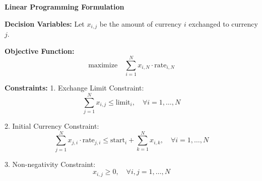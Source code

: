 \documentclass{article}
\begin{document}
\textbf{Linear Programming Formulation}

\textbf{Decision Variables:}
Let \( x_{i,j} \) be the amount of currency \( i \) exchanged to currency \( j \).

\textbf{Objective Function:}
\[
\text{maximize} \quad \sum_{i=1}^{N} x_{i,N} \cdot \text{rate}_{i,N}
\]

\textbf{Constraints:}
1. Exchange Limit Constraint:
\[
\sum_{j=1}^{N} x_{i,j} \leq \text{limit}_i, \quad \forall i = 1, \ldots, N
\]

2. Initial Currency Constraint:
\[
\sum_{j=1}^{N} x_{j,i} \cdot \text{rate}_{j,i} \leq \text{start}_i + \sum_{k=1}^{N} x_{i,k}, \quad \forall i = 1, \ldots, N
\]

3. Non-negativity Constraint:
\[
x_{i,j} \geq 0, \quad \forall i, j = 1, \ldots, N
\]
\end{document}
